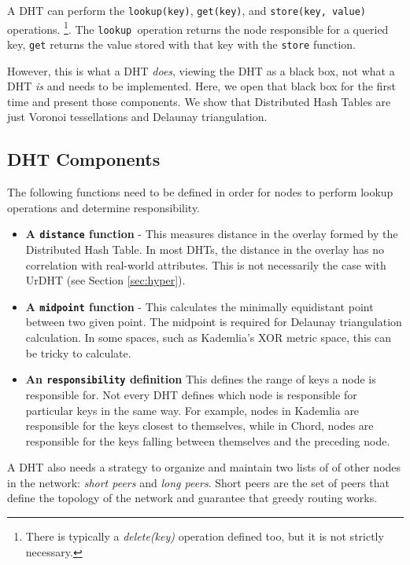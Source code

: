 \documentclass[11pt,conference]{IEEEtran}
\begin{document}
A DHT can perform the \texttt{lookup(key)}, \texttt{get(key)}, and \texttt{store(key, value)} operations. \footnote{There is typically a \textit{delete(key)} operation defined too, but it is not strictly necessary.}.
The \texttt{lookup }operation returns the node responsible for a queried key, \texttt{get} returns the value stored with that key with the \texttt{store} function.

However, this is what a DHT \textit{does}, viewing the DHT as a black box, not what a DHT \textit{is} and needs to be implemented.
Here, we open that black box for the first time and present those components.
We show that Distributed Hash Tables are just Voronoi tessellations and Delaunay triangulation.


\subsection{DHT Components}
The following functions need to be defined in order for nodes to perform lookup operations and determine responsibility.
\begin{itemize}
	\item \textbf{A \texttt{distance} function } - 
	This measures distance in the overlay formed by the Distributed Hash Table.
	In most DHTs, the distance in the overlay has no correlation with real-world attributes.
	This is not necessarily the case with UrDHT (see Section \ref{sec:hyper}).
	
	\item \textbf{A \texttt{midpoint} function} - This calculates the minimally equidistant point between two given point.
	The midpoint is required for Delaunay triangulation calculation.
	In some spaces, such as Kademlia's XOR metric space, this can be tricky to calculate.  %
	\item \textbf{An \texttt{responsibility} definition}  This defines the range of keys a node is responsible for. 
	Not every DHT defines which node is responsible for particular keys in the same way. 
	For example, nodes in Kademlia are responsible for the keys closest to themselves, while in Chord, nodes are responsible for the keys falling between themselves and the preceding node.
\end{itemize}


A DHT also needs a strategy to organize and maintain two lists of of other nodes in the network: \textit{short peers} and \textit{long peers}.
Short peers are the set of peers that define the topology of the network and guarantee that greedy routing works.
\end{document}

